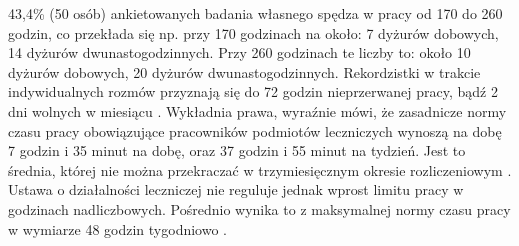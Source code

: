 \documentclass[a4paper,12pt,twoside,openright]{mwrep}
\begin{document}
 43,4\%  (50 osób) ankietowanych badania własnego spędza w pracy od 170 do 260 godzin, co przekłada się np. przy 170 godzinach na około:  7 dyżurów dobowych, 14 dyżurów dwunastogodzinnych. Przy 260 godzinach te liczby to: około  10 dyżurów dobowych,  20 dyżurów dwunastogodzinnych. Rekordzistki w trakcie indywidualnych rozmów przyznają się do 72 godzin nieprzerwanej pracy, bądź 2 dni wolnych w miesiącu \cite{cyfrowe}.  Wykładnia prawa, wyraźnie mówi, że zasadnicze normy czasu pracy obowiązujące pracowników podmiotów leczniczych wynoszą na dobę 7 godzin i 35 minut na dobę, oraz 37 godzin i 55 minut na tydzień. Jest to średnia, której nie można przekraczać w trzymiesięcznym okresie rozliczeniowym \cite{okres}. Ustawa o działalności leczniczej nie reguluje  jednak wprost limitu pracy w godzinach nadliczbowych. Pośrednio wynika to z maksymalnej normy czasu pracy w wymiarze 48 godzin tygodniowo \cite{klauzula}.
\end{document}
